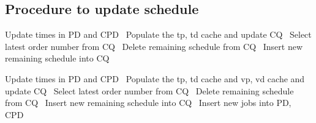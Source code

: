 \subsection{Procedure to update schedule}
\nwenddocs{}\endmoddef{}
\LA{}Update times in PD and CPD~{\nwtagstyle{}}\RA{}
\LA{}Populate the tp, td cache and update CQ~{\nwtagstyle{}}\RA{}
\LA{}Select latest order number from CQ~{\nwtagstyle{}}\RA{}
\LA{}Delete remaining schedule from CQ~{\nwtagstyle{}}\RA{}
\LA{}Insert new remaining schedule into CQ~{\nwtagstyle{}}\RA{}
\nwendcode{}\nwdocspar

\nwenddocs{}\endmoddef{}
\LA{}Update times in PD and CPD~{\nwtagstyle{}}\RA{}
\LA{}Populate the tp, td cache and vp, vd cache and update CQ~{\nwtagstyle{}}\RA{}
\LA{}Select latest order number from CQ~{\nwtagstyle{}}\RA{}
\LA{}Delete remaining schedule from CQ~{\nwtagstyle{}}\RA{}
\LA{}Insert new remaining schedule into CQ~{\nwtagstyle{}}\RA{}
\LA{}Insert new jobs into PD, CPD~{\nwtagstyle{}}\RA{}
\nwendcode{}\nwdocspar

